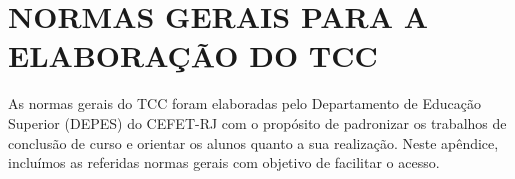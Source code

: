 \section{NORMAS GERAIS PARA A ELABORAÇÃO DO  TCC} \label{ap:normas}

As normas gerais do TCC foram elaboradas pelo Departamento de Educação Superior (DEPES)
do CEFET-RJ com o propósito de padronizar os trabalhos de conclusão de curso e orientar os
alunos quanto a sua realização.
%
%
Neste apêndice, incluímos as referidas normas gerais com objetivo de facilitar o acesso.   



